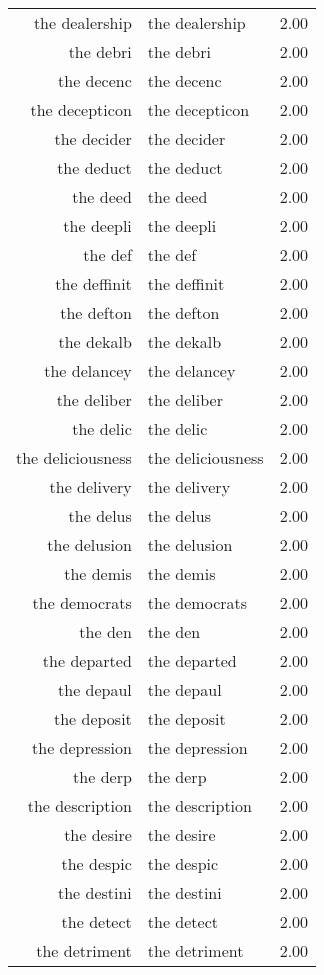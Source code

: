 \begin{table}[ht]
\begin{tabular}{rlr}
  the dealership & the dealership & 2.00 \\ 
  the debri & the debri & 2.00 \\ 
  the decenc & the decenc & 2.00 \\ 
  the decepticon & the decepticon & 2.00 \\ 
  the decider & the decider & 2.00 \\ 
  the deduct & the deduct & 2.00 \\ 
  the deed & the deed & 2.00 \\ 
  the deepli & the deepli & 2.00 \\ 
  the def & the def & 2.00 \\ 
  the deffinit & the deffinit & 2.00 \\ 
  the defton & the defton & 2.00 \\ 
  the dekalb & the dekalb & 2.00 \\ 
  the delancey & the delancey & 2.00 \\ 
  the deliber & the deliber & 2.00 \\ 
  the delic & the delic & 2.00 \\ 
  the deliciousness & the deliciousness & 2.00 \\ 
  the delivery & the delivery & 2.00 \\ 
  the delus & the delus & 2.00 \\ 
  the delusion & the delusion & 2.00 \\ 
  the demis & the demis & 2.00 \\ 
  the democrats & the democrats & 2.00 \\ 
  the den & the den & 2.00 \\ 
  the departed & the departed & 2.00 \\ 
  the depaul & the depaul & 2.00 \\ 
  the deposit & the deposit & 2.00 \\ 
  the depression & the depression & 2.00 \\ 
  the derp & the derp & 2.00 \\ 
  the description & the description & 2.00 \\ 
  the desire & the desire & 2.00 \\ 
  the despic & the despic & 2.00 \\ 
  the destini & the destini & 2.00 \\ 
  the detect & the detect & 2.00 \\ 
  the detriment & the detriment & 2.00 \\ 

\end{tabular}
\end{table}
